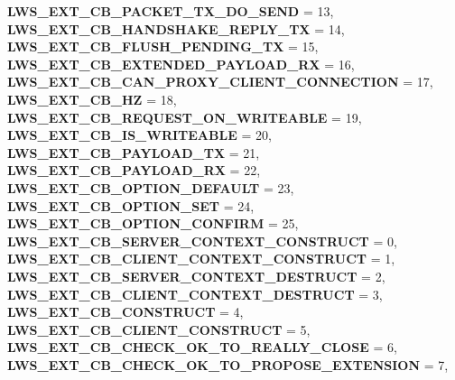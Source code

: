 \begin{DoxyCompactItemize}
{\bfseries L\+W\+S\+\_\+\+E\+X\+T\+\_\+\+C\+B\+\_\+\+P\+A\+C\+K\+E\+T\+\_\+\+T\+X\+\_\+\+D\+O\+\_\+\+S\+E\+ND} = 13, 
\newline
{\bfseries L\+W\+S\+\_\+\+E\+X\+T\+\_\+\+C\+B\+\_\+\+H\+A\+N\+D\+S\+H\+A\+K\+E\+\_\+\+R\+E\+P\+L\+Y\+\_\+\+TX} = 14, 
{\bfseries L\+W\+S\+\_\+\+E\+X\+T\+\_\+\+C\+B\+\_\+\+F\+L\+U\+S\+H\+\_\+\+P\+E\+N\+D\+I\+N\+G\+\_\+\+TX} = 15, 
{\bfseries L\+W\+S\+\_\+\+E\+X\+T\+\_\+\+C\+B\+\_\+\+E\+X\+T\+E\+N\+D\+E\+D\+\_\+\+P\+A\+Y\+L\+O\+A\+D\+\_\+\+RX} = 16, 
{\bfseries L\+W\+S\+\_\+\+E\+X\+T\+\_\+\+C\+B\+\_\+\+C\+A\+N\+\_\+\+P\+R\+O\+X\+Y\+\_\+\+C\+L\+I\+E\+N\+T\+\_\+\+C\+O\+N\+N\+E\+C\+T\+I\+ON} = 17, 
\newline
{\bfseries L\+W\+S\+\_\+\+E\+X\+T\+\_\+\+C\+B\+\_\+HZ} = 18, 
{\bfseries L\+W\+S\+\_\+\+E\+X\+T\+\_\+\+C\+B\+\_\+\+R\+E\+Q\+U\+E\+S\+T\+\_\+\+O\+N\+\_\+\+W\+R\+I\+T\+E\+A\+B\+LE} = 19, 
{\bfseries L\+W\+S\+\_\+\+E\+X\+T\+\_\+\+C\+B\+\_\+\+I\+S\+\_\+\+W\+R\+I\+T\+E\+A\+B\+LE} = 20, 
{\bfseries L\+W\+S\+\_\+\+E\+X\+T\+\_\+\+C\+B\+\_\+\+P\+A\+Y\+L\+O\+A\+D\+\_\+\+TX} = 21, 
\newline
{\bfseries L\+W\+S\+\_\+\+E\+X\+T\+\_\+\+C\+B\+\_\+\+P\+A\+Y\+L\+O\+A\+D\+\_\+\+RX} = 22, 
{\bfseries L\+W\+S\+\_\+\+E\+X\+T\+\_\+\+C\+B\+\_\+\+O\+P\+T\+I\+O\+N\+\_\+\+D\+E\+F\+A\+U\+LT} = 23, 
{\bfseries L\+W\+S\+\_\+\+E\+X\+T\+\_\+\+C\+B\+\_\+\+O\+P\+T\+I\+O\+N\+\_\+\+S\+ET} = 24, 
{\bfseries L\+W\+S\+\_\+\+E\+X\+T\+\_\+\+C\+B\+\_\+\+O\+P\+T\+I\+O\+N\+\_\+\+C\+O\+N\+F\+I\+RM} = 25, 
\newline
{\bfseries L\+W\+S\+\_\+\+E\+X\+T\+\_\+\+C\+B\+\_\+\+S\+E\+R\+V\+E\+R\+\_\+\+C\+O\+N\+T\+E\+X\+T\+\_\+\+C\+O\+N\+S\+T\+R\+U\+CT} = 0, 
{\bfseries L\+W\+S\+\_\+\+E\+X\+T\+\_\+\+C\+B\+\_\+\+C\+L\+I\+E\+N\+T\+\_\+\+C\+O\+N\+T\+E\+X\+T\+\_\+\+C\+O\+N\+S\+T\+R\+U\+CT} = 1, 
{\bfseries L\+W\+S\+\_\+\+E\+X\+T\+\_\+\+C\+B\+\_\+\+S\+E\+R\+V\+E\+R\+\_\+\+C\+O\+N\+T\+E\+X\+T\+\_\+\+D\+E\+S\+T\+R\+U\+CT} = 2, 
{\bfseries L\+W\+S\+\_\+\+E\+X\+T\+\_\+\+C\+B\+\_\+\+C\+L\+I\+E\+N\+T\+\_\+\+C\+O\+N\+T\+E\+X\+T\+\_\+\+D\+E\+S\+T\+R\+U\+CT} = 3, 
\newline
{\bfseries L\+W\+S\+\_\+\+E\+X\+T\+\_\+\+C\+B\+\_\+\+C\+O\+N\+S\+T\+R\+U\+CT} = 4, 
{\bfseries L\+W\+S\+\_\+\+E\+X\+T\+\_\+\+C\+B\+\_\+\+C\+L\+I\+E\+N\+T\+\_\+\+C\+O\+N\+S\+T\+R\+U\+CT} = 5, 
{\bfseries L\+W\+S\+\_\+\+E\+X\+T\+\_\+\+C\+B\+\_\+\+C\+H\+E\+C\+K\+\_\+\+O\+K\+\_\+\+T\+O\+\_\+\+R\+E\+A\+L\+L\+Y\+\_\+\+C\+L\+O\+SE} = 6, 
{\bfseries L\+W\+S\+\_\+\+E\+X\+T\+\_\+\+C\+B\+\_\+\+C\+H\+E\+C\+K\+\_\+\+O\+K\+\_\+\+T\+O\+\_\+\+P\+R\+O\+P\+O\+S\+E\+\_\+\+E\+X\+T\+E\+N\+S\+I\+ON} = 7, 

\end{DoxyCompactItemize}
